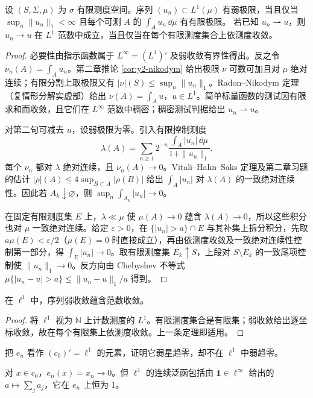 \begin{theorem}[$L^1$ 的逐集合判据与强收敛]\label{thm:y5-l1}
设 $(S,\Sigma,\mu)$ 为 $\sigma$ 有限测度空间。序列 $(u_n)\subset L^1(\mu)$ 有弱极限，当且仅当 $\sup_n\|u_n\|_1<\infty$ 且每个可测 $A$ 的 $\int_Au_n\,\dd\mu$ 有有限极限。
若已知 $u_n\rightharpoonup u$，则 $u_n\to u$ 在 $L^1$ 范数中成立，当且仅当在每个有限测度集合上依测度收敛。
\end{theorem}
\begin{proof}
必要性由指示函数属于 $L^\infty=(L^1)'$ 及弱收敛有界性得出。反之令 $\nu_n(A)=\int_Au_n$。第二章推论 \ref{cor:y2-nikodym} 给出极限 $\nu$ 可数可加且对 $\mu$ 绝对连续；有限分割上取极限又有 $|\nu|(S)\le\sup_n\|u_n\|_1$。Radon--Nikodym 定理（复情形分解实虚部）给出 $\nu(A)=\int_Au$，$u\in L^1$。简单标量函数的测试因有限求和而收敛，且它们在 $L^\infty$ 范数中稠密；稠密测试判据给出 $u_n\rightharpoonup u$。

对第二句可减去 $u$，设弱极限为零。引入有限控制测度
\[
 \lambda(A)=\sum_{n\ge1}2^{-n}\frac{\int_A|u_n|\,\dd\mu}{1+\|u_n\|_1}.
\]
每个 $\nu_n$ 都对 $\lambda$ 绝对连续，且 $\nu_n(A)\to0$。Vitali--Hahn--Saks 定理及第二章习题的估计
$|\rho|(A)\le4\sup_{B\subset A}|\rho(B)|$ 给出 $\int_A|u_n|$ 对 $\lambda(A)$ 的一致绝对连续性。因此若 $A_k\downarrow\varnothing$，则 $\sup_n\int_{A_k}|u_n|\to0$。

在固定有限测度集 $E$ 上，$\lambda\ll\mu$ 使 $\mu(A)\to0$ 蕴含 $\lambda(A)\to0$，所以这些积分也对 $\mu$ 一致绝对连续。给定 $\varepsilon>0$，在 $\{|u_n|>a\}\cap E$ 与其补集上拆分积分，先取 $a\mu(E)<\varepsilon/2$（$\mu(E)=0$ 时直接成立），再由依测度收敛及一致绝对连续性控制第一部分，得 $\int_E|u_n|\to0$。取有限测度集 $E_k\uparrow S$，上段对 $S\setminus E_k$ 的一致尾项控制使 $\|u_n\|_1\to0$。反方向由 Chebyshev 不等式 $\mu\{|u_n-u|>a\}\le\|u_n-u\|_1/a$ 得到。
\end{proof}

\begin{corollary}[Schur 性质]
在 $\ell^1$ 中，序列弱收敛蕴含范数收敛。
\end{corollary}
\begin{proof}
将 $\ell^1$ 视为 $\mathbb N$ 上计数测度的 $L^1$。有限测度集合是有限集；弱收敛给出逐坐标收敛，故在每个有限集上依测度收敛。上一条定理即适用。
\end{proof}

\begin{exercise}[弱星不等于弱]\label{ex:y5-star}
把 $e_n$ 看作 $(c_0)'=\ell^1$ 的元素，证明它弱星趋零，却不在 $\ell^1$ 中弱趋零。
\end{exercise}
\begin{solution}
对 $x\in c_0$，$e_n(x)=x_n\to0$。但 $\ell^1$ 的连续泛函包括由 $\mathbf1\in\ell^\infty$ 给出的 $a\mapsto\sum_ja_j$，它在 $e_n$ 上恒为 1。
\end{solution}

